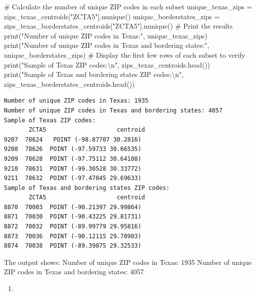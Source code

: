 \documentclass[
  letterpaper,
  DIV=11,
  numbers=noendperiod]{scrartcl}
\newenvironment{Shaded}{\begin{snugshade}}{\end{snugshade}}
\newcommand{\BuiltInTok}[1]{\textcolor[rgb]{0.00,0.23,0.31}{#1}}
\newcommand{\CharTok}[1]{\textcolor[rgb]{0.13,0.47,0.30}{#1}}
\newcommand{\CommentTok}[1]{\textcolor[rgb]{0.37,0.37,0.37}{#1}}
\newcommand{\NormalTok}[1]{\textcolor[rgb]{0.00,0.23,0.31}{#1}}
\newcommand{\OperatorTok}[1]{\textcolor[rgb]{0.37,0.37,0.37}{#1}}
\newcommand{\StringTok}[1]{\textcolor[rgb]{0.13,0.47,0.30}{#1}}
\providecommand{\tightlist}{%
  \setlength{\itemsep}{0pt}\setlength{\parskip}{0pt}}\usepackage{longtable,booktabs,array}
\begin{document}
\begin{Shaded}
\begin{Highlighting}[]
\CommentTok{\# Calculate the number of unique ZIP codes in each subset}
\NormalTok{unique\_texas\_zips }\OperatorTok{=}\NormalTok{ zips\_texas\_centroids[}\StringTok{"ZCTA5"}\NormalTok{].nunique()}
\NormalTok{unique\_borderstates\_zips }\OperatorTok{=}\NormalTok{ zips\_texas\_borderstates\_centroids[}\StringTok{"ZCTA5"}\NormalTok{].nunique()}
\CommentTok{\# Print the results}
\BuiltInTok{print}\NormalTok{(}\StringTok{"Number of unique ZIP codes in Texas:"}\NormalTok{, unique\_texas\_zips)}
\BuiltInTok{print}\NormalTok{(}\StringTok{"Number of unique ZIP codes in Texas and bordering states:"}\NormalTok{, unique\_borderstates\_zips)}
\CommentTok{\# Display the first few rows of each subset to verify}
\BuiltInTok{print}\NormalTok{(}\StringTok{"Sample of Texas ZIP codes:}\CharTok{\textbackslash{}n}\StringTok{"}\NormalTok{, zips\_texas\_centroids.head())}
\BuiltInTok{print}\NormalTok{(}\StringTok{"Sample of Texas and bordering states ZIP codes:}\CharTok{\textbackslash{}n}\StringTok{"}\NormalTok{, zips\_texas\_borderstates\_centroids.head())}
\end{Highlighting}
\end{Shaded}

\begin{verbatim}
Number of unique ZIP codes in Texas: 1935
Number of unique ZIP codes in Texas and bordering states: 4057
Sample of Texas ZIP codes:
       ZCTA5                    centroid
9207  78624   POINT (-98.87707 30.2816)
9208  78626  POINT (-97.59733 30.66535)
9209  78628  POINT (-97.75112 30.64108)
9210  78631  POINT (-99.30528 30.33772)
9211  78632  POINT (-97.47045 29.69633)
Sample of Texas and bordering states ZIP codes:
       ZCTA5                    centroid
8870  70003  POINT (-90.21397 29.99864)
8871  70030  POINT (-90.43225 29.81731)
8872  70032  POINT (-89.99779 29.95816)
8873  70036  POINT (-90.12115 29.70903)
8874  70038  POINT (-89.39875 29.32533)
\end{verbatim}

The output shows: Number of unique ZIP codes in Texas: 1935 Number of
unique ZIP codes in Texas and bordering states: 4057

\begin{enumerate}
\def\labelenumi{\arabic{enumi}.}
\setcounter{enumi}{2}
\tightlist
\item
\end{enumerate}
\end{document}
